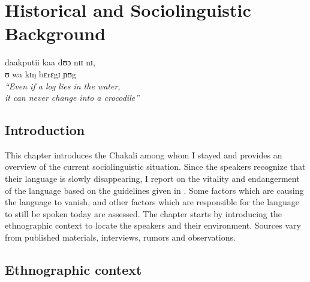 
\chapter{Historical and Sociolinguistic Background}
\label{sec:SOC-lingvit}


\begin{flushright}

{\C daakputii kaa dʊɔ nɪɪ nɪ,\\ ʊ wa kɪŋ bɛrɛgɪ  ɲʊg}\\[1ex]
{\it ``Even if a log lies in the water,\\ it can never change into a
crocodile''}\\[2ex]

\end{flushright}


\section{Introduction}
\label{sec:SOC-Intro}


This chapter introduces the Chakali among whom I stayed and provides an
overview of the current sociolinguistic situation. Since the
speakers recognize that their language is slowly disappearing, I  report on
the vitality and endangerment of the language based on the 
guidelines given in \cite{UNES03, Reco03}.   Some factors
which are causing the language to vanish, and  other factors which are
responsible
for the language to still be spoken today are assessed. The chapter starts
by introducing the
ethnographic context  to locate the speakers and their environment. Sources
vary from published materials, interviews, rumors and observations. 




\section{Ethnographic context}
\label{sec:SOC-ethno}

